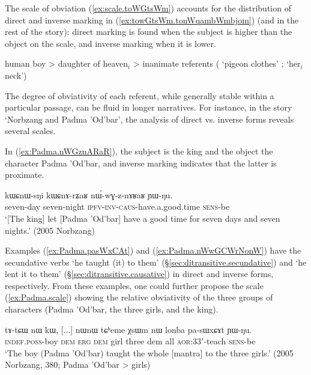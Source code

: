 The scale of obviation (\ref{ex:scale.toWGtsWm}) accounts for the distribution of direct and inverse marking in (\ref{ex:towGtsWm.tonWqambWmbjom}) (and in the rest of the story): direct marking is found when the subject is higher than the object on the scale, and inverse marking when it is lower.

\begin{exe}
\ex \label{ex:scale.toWGtsWm}
\glt human boy > daughter of heaven$_i$ > inanimate referents ( `pigeon clothes' ;  `her$_i$ neck')
\end{exe}

The degree of obviativity of each referent, while generally stable within a particular passage, can be fluid in longer narratives. For instance, in the story `Norbzang and Padma 'Od'bar', the analysis of direct vs. inverse forms reveals several scales. 

In (\ref{ex:Padma.nWGznARaR}), the subject is the king and the object the character Padma 'Od'bar, and inverse marking indicates that the latter is proximate.

\begin{exe}
\ex \label{ex:Padma.nWGznARaR}
\gll kɯɕnɯ-sŋi kɯɕnɤ-rʑaʁ nɯ́-wɣ-z-nɤʁaʁ ɲɯ-ŋu. \\
seven-day seven-night \textsc{ipfv}-\textsc{inv}-\textsc{caus}-have.a.good.time \textsc{sens}-be \\
\glt `[The king] let [Padma 'Od'bar] have a good time for seven days and seven nights.' (2005 Norbzang)
\end{exe}

Examples (\ref{ex:Padma.pasWxCAt}) and (\ref{ex:Padma.nWwGCWrNonW}) have the secundative verbs  `he taught (it) to them' (§\ref{sec:ditransitive.secundative}) and  `he lent it to them' (§\ref{sec:ditransitive.causative}) in direct and inverse forms, respectively. From these examples, one could further propose the scale (\ref{ex:Padma.scale}) showing the relative obviativity of the three groups of characters (Padma 'Od'bar, the three girls, and the king).

\begin{exe}
\ex \label{ex:Padma.pasWxCAt}
\gll tɤ-tɕɯ nɯ kɯ, [...] nɯnɯ tɕʰeme χsɯm nɯ lonba pa-sɯxɕɤt ɲɯ-ŋu. \\
\textsc{indef}.\textsc{poss}-boy \textsc{dem} \textsc{erg} { } \textsc{dem} girl three dem all \textsc{aor}:3\fl{}3$'$-teach \textsc{sens}-be \\
\glt `The boy (Padma 'Od'bar) taught the whole [mantra] to the three girls.' (2005 Norbzang, 380; Padma 'Od'bar > girls)
\end{exe}

